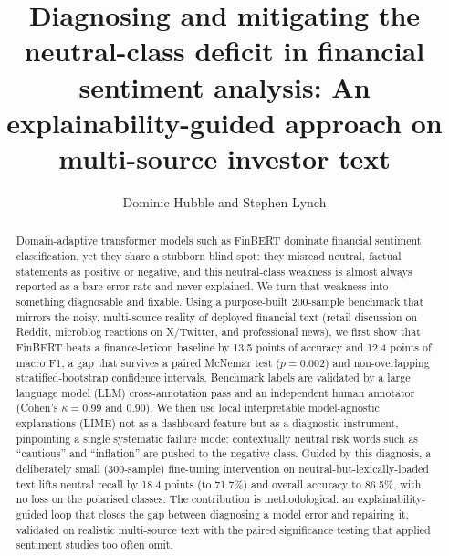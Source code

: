 \documentclass{aims}
\numberwithin{equation}{section}
\begin{document}
\title{Diagnosing and mitigating the neutral-class deficit in financial sentiment analysis: An explainability-guided approach on multi-source investor text}

\author{%
  Dominic Hubble
  and
  Stephen Lynch\corrauth
}


\address{%
  }


\begin{abstract}
Domain-adaptive transformer models such as FinBERT dominate financial sentiment
classification, yet they share a stubborn blind spot: they misread neutral, factual
statements as positive or negative, and this neutral-class weakness is almost always
reported as a bare error rate and never explained. We turn that weakness into
something diagnosable and fixable. Using a purpose-built 200-sample benchmark that
mirrors the noisy, multi-source reality of deployed financial text (retail
discussion on Reddit, microblog reactions on X/Twitter, and professional news), we
first show that FinBERT beats a finance-lexicon baseline by 13.5 points of accuracy
and 12.4 points of macro F1, a gap that survives a paired McNemar test
($p = 0.002$) and non-overlapping stratified-bootstrap confidence intervals.
Benchmark labels are validated by a large language model (LLM) cross-annotation pass
and an independent human annotator (Cohen's $\kappa = 0.99$ and $0.90$). We then use
local interpretable model-agnostic explanations (LIME) not as a dashboard feature
but as a diagnostic instrument, pinpointing a single systematic failure mode:
contextually neutral risk words such as ``cautious'' and ``inflation'' are pushed to
the negative class. Guided by this diagnosis, a deliberately small (300-sample)
fine-tuning intervention on neutral-but-lexically-loaded text lifts neutral recall by
18.4 points (to 71.7\%) and overall accuracy to 86.5\%, with no loss on the
polarised classes. The contribution is methodological: an explainability-guided loop
that closes the gap between diagnosing a model error and repairing it, validated on
realistic multi-source text with the paired significance testing that applied
sentiment studies too often omit.
\end{abstract}
\end{document}
